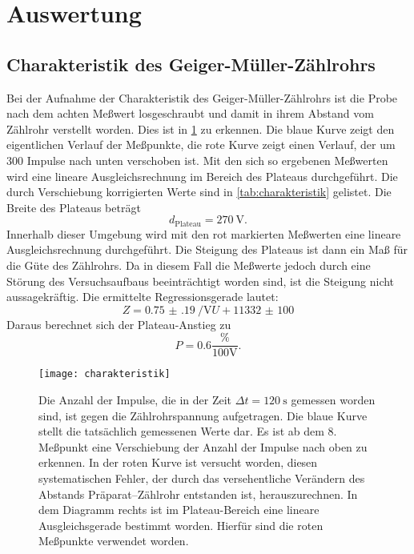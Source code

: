 
\section{Auswertung}

\subsection{Charakteristik des Geiger-Müller-Zählrohrs}

Bei der Aufnahme der Charakteristik des Geiger-Müller-Zählrohrs ist die
Probe nach dem achten Meßwert losgeschraubt und damit in ihrem Abstand
vom Zählrohr verstellt worden. Dies ist in \cref{fig:charakteristik} zu
erkennen. Die blaue Kurve zeigt den eigentlichen Verlauf der Meßpunkte,
die rote Kurve zeigt einen Verlauf, der um 300 Impulse nach unten
verschoben ist. Mit den sich so ergebenen Meßwerten wird eine lineare
Ausgleichsrechnung im Bereich des Plateaus durchgeführt. Die durch
Verschiebung korrigierten Werte sind in \cref{tab:charakteristik}
gelistet. Die Breite des Plateaus beträgt
%
\begin{equation}
  d_\text{Plateau} = \SI{270}{\volt}.
\end{equation}
%
Innerhalb dieser Umgebung wird mit den rot markierten Meßwerten eine
lineare Ausgleichsrechnung durchgeführt. Die Steigung des Plateaus ist
dann ein Maß für die Güte des Zählrohrs. Da in diesem Fall die Meßwerte
jedoch durch eine Störung des Versuchsaufbaus beeinträchtigt worden
sind, ist die Steigung nicht aussagekräftig. Die ermittelte
Regressionsgerade lautet:
%
\begin{equation}
  Z = \SI{0.75(19)}{\per\volt} U + \num{11332(100)}
\end{equation}
Daraus berechnet sich der Plateau-Anstieg zu
\begin{equation}
  P = \num{0.6} \frac{\%}{100 \mathrm{V}}.
\end{equation}

\begin{figure}
  \centering
  \texttt{[image: charakteristik]}
  \caption{Die Anzahl der Impulse, die in der Zeit $\Delta t =
    \SI{120}{\second}$ gemessen worden sind, ist gegen die
    Zählrohrspannung aufgetragen. Die blaue Kurve stellt die tatsächlich
    gemessenen Werte dar. Es ist ab dem 8. Meßpunkt eine Verschiebung
    der Anzahl der Impulse nach oben zu erkennen. In der roten Kurve ist
    versucht worden, diesen systematischen Fehler, der durch das
    versehentliche Verändern des Abstands Präparat--Zählrohr entstanden
    ist, herauszurechnen. In dem Diagramm rechts ist im Plateau-Bereich
    eine lineare Ausgleichsgerade bestimmt worden. Hierfür sind die
    roten Meßpunkte verwendet worden.}
  \label{fig:charakteristik}
\end{figure}

